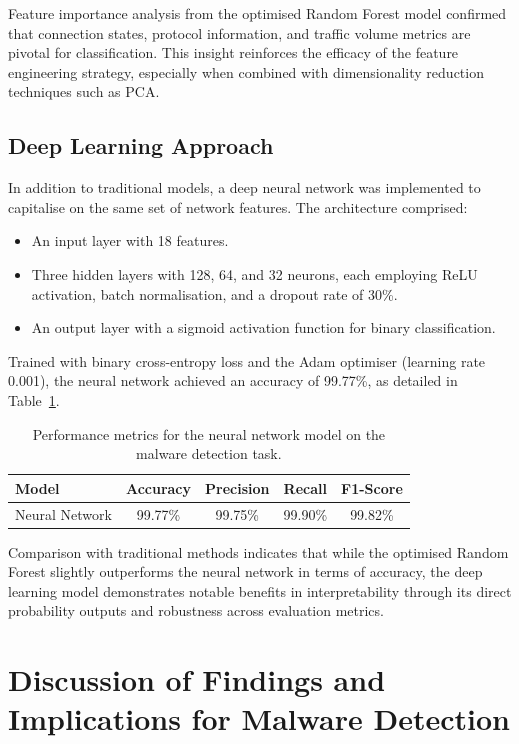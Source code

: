 Feature importance analysis from the optimised Random Forest model confirmed that connection states, protocol information, and traffic volume metrics are pivotal for classification. This insight reinforces the efficacy of the feature engineering strategy, especially when combined with dimensionality reduction techniques such as PCA.

\subsection{Deep Learning Approach}

In addition to traditional models, a deep neural network was implemented to capitalise on the same set of network features. The architecture comprised:
\begin{itemize}
    \item An input layer with 18 features.
    \item Three hidden layers with 128, 64, and 32 neurons, each employing ReLU activation, batch normalisation, and a dropout rate of 30\%.
    \item An output layer with a sigmoid activation function for binary classification.
\end{itemize}

Trained with binary cross-entropy loss and the Adam optimiser (learning rate 0.001), the neural network achieved an accuracy of 99.77\%, as detailed in Table~\ref{tab:nn_performance}.

\begin{table}[ht]
\center
\begin{tabular}{lcccc}
\hline
\textbf{Model} & \textbf{Accuracy} & \textbf{Precision} & \textbf{Recall} & \textbf{F1-Score} \\
\hline
Neural Network    & 99.77\% & 99.75\% & 99.90\% & 99.82\% \\
\hline
\end{tabular}
\caption{Performance metrics for the neural network model on the malware detection task.}
\label{tab:nn_performance}
\end{table}

Comparison with traditional methods indicates that while the optimised Random Forest slightly outperforms the neural network in terms of accuracy, the deep learning model demonstrates notable benefits in interpretability through its direct probability outputs and robustness across evaluation metrics.

\section{Discussion of Findings and Implications for Malware Detection}

